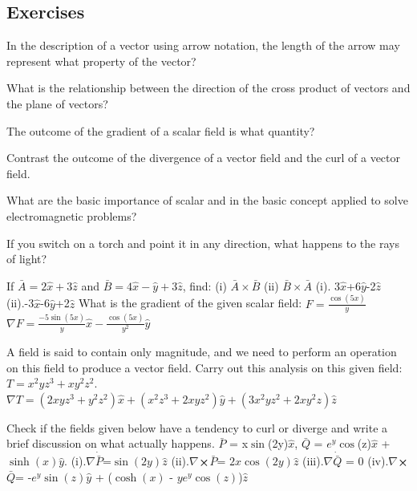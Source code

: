 \begin{mdframed}[ backgroundcolor=lightblue, linewidth=1pt, hidealllines=true]
\section{Exercises}
\begin{ExerciseList}
	\Exercise[label={ex161}] 
	In the description of a vector using arrow notation, the length of the arrow may represent what property of the vector?
	
	\Exercise[label={ex162}] 
	What is the relationship between the direction of the cross product of vectors and the plane of vectors?
	
	\Exercise[label={ex163}] 
	The outcome of the gradient of a scalar field is what quantity?
	
	\Exercise[label={ex164}] 
	Contrast the outcome of the divergence of a vector field and the curl of a vector field. 
	
	\Exercise[label={ex165}] 
	What are the basic importance of scalar and  in the basic concept applied to solve electromagnetic problems?  
	
	\Exercise[label={ex166}] 
	If you switch on a torch and point it in any direction, what happens to the rays of light?
	
	\Exercise[label={ex167}] 
	If $\bar{A} = 2\hat{x} + 3\hat{z}$ and $\bar{B} = 4\hat{x} - \hat{y} + 3\hat{z}$, find: 
	(i) $\bar{A} \times \bar{B}$
	(ii) $\bar{B} \times \bar{A}$  
	\Answer
	(i). 3$\hat{x}$+6$\hat{y}$-2$\hat{z}$
	(ii).-3$\hat{x}$-6$\hat{y}$+2$\hat{z}$
	\Exercise[label={ex168}] 
	What is the gradient of the given scalar field: $F = \frac{\cos(5x)}{y}$
	\Answer
	$\nabla F = \frac{-5\sin(5x)}{y}\hat{x} - \frac{\cos(5x)}{y^2}\hat{y}$


	\Exercise[label={ex169}] 
	A field is said to contain only magnitude, and we need to perform an operation on this field to produce a vector field. Carry out this analysis on this given field: $T = x^2yz^3 + xy^2z^2$.
	\Answer
	$\nabla T= (2xyz^3+y^2z^2)\hat{x}+(x^2z^3+2xyz^2)\hat{y}+(3x^2yz^2+2xy^2z)\hat{z}$

	\Exercise[label={ex1610}] 
	Check if the fields given below have a tendency to curl or diverge and write a brief discussion on what actually happens.
	$\bar{P}$ = x$\sin$(2y)$\hat{x}$, $\bar{Q}$ = $e^{y}$$\cos$(z)$\hat{x}$ + $\sinh(x)$$\hat{y}$.
	\Answer
	(i).$\nabla$$\dot{\bar{P}}$=$\sin(2y)$$\hat{z}$
	(ii).$\nabla$$\cross$$\bar{P}$= $2x\cos(2y)$$\hat{z}$
	(iii).$\nabla$$\dot{\bar{Q}}$ = 0
	(iv).$\nabla$$\cross$$\bar{Q}$= -$e^{y}$$\sin(z)$$\hat{y}$ + ($\cosh(x)$ - $ye^{y}$$\cos(z)$)$\hat{z}$
\end{ExerciseList}
\end{mdframed}